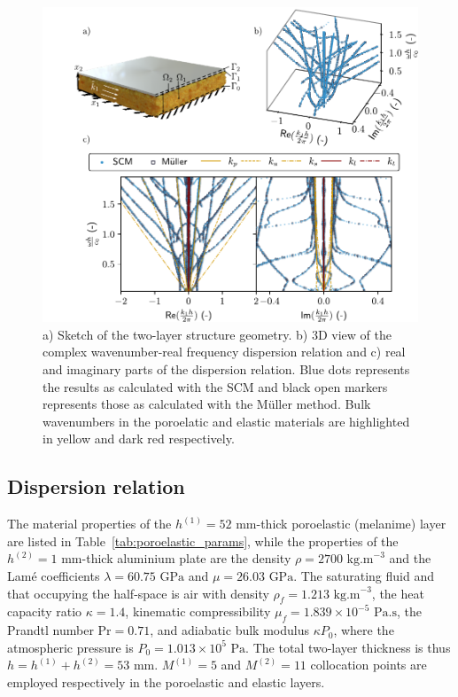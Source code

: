     \begin{figure}
        \centering
        \includegraphics{chapitres/article_JAP/bicouche.pdf}
        \caption{ a) Sketch of the two-layer structure geometry. b) 3D view of the complex wavenumber-real frequency dispersion relation and c) real and imaginary parts of the dispersion relation. Blue dots represents the results as calculated with the SCM and black open markers represents those as calculated with the Müller method. Bulk wavenumbers in the poroelatic and elastic materials are highlighted in yellow and dark red respectively.}
        \label{fig:bilayer}
    \end{figure}
    
    \subsection{Dispersion relation}\label{Disrel}
The material properties of the $h^{(1)}= 52\textrm{ mm}$-thick poroelastic (melanime) layer are listed in Table~\ref{tab:poroelastic_params}, while the properties of the $h^{(2)}=1\textrm{ mm}$-thick aluminium plate are the density $\rho = 2700 \textrm{ kg.m}^{-3}$ and the Lamé coefficients $\lambda = 60.75 \textrm{ GPa}$ and $\mu =  26.03 \textrm{ GPa}$. The saturating fluid and that occupying the half-space is air with density $\rho_f = 1.213\textrm{ kg.m}^{-3}$, the heat capacity ratio $\kappa = 1.4$, kinematic compressibility $\mu_f = 1.839 \times 10^{-5} \textrm{ Pa.s}$, the Prandtl number $\textrm{Pr} = 0.71$, and adiabatic bulk modulus $\kappa P_0$, where the atmospheric pressure is $P_0 = 1.013 \times 10^5 \textrm{ Pa}$. The total two-layer thickness is thus $h=h^{(1)}+h^{(2)}=53\textrm{ mm}$. $M^{(1)}=5$ and $M^{(2)}=11$ collocation points are employed respectively in the poroelastic and elastic layers.
    
